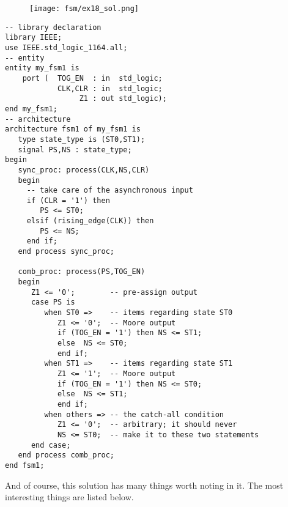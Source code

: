 \begin{figure}[!h]
    \centering
	\texttt{[image: fsm/ex18\_sol.png]}
\end{figure}

\noindent
\begin{minipage}{0.99\linewidth}
\begin{lstlisting}[label=exe_18_code, caption=Solution to Example~18.]
-- library declaration
library IEEE;
use IEEE.std_logic_1164.all;
-- entity
entity my_fsm1 is
    port (  TOG_EN  : in  std_logic;
            CLK,CLR : in  std_logic;
                 Z1 : out std_logic);
end my_fsm1;
-- architecture
architecture fsm1 of my_fsm1 is
   type state_type is (ST0,ST1);
   signal PS,NS : state_type;
begin
   sync_proc: process(CLK,NS,CLR)
   begin
     -- take care of the asynchronous input
     if (CLR = '1') then
        PS <= ST0;
     elsif (rising_edge(CLK)) then
        PS <= NS;
     end if;
   end process sync_proc;

   comb_proc: process(PS,TOG_EN)
   begin
      Z1 <= '0';        -- pre-assign output
      case PS is
         when ST0 =>    -- items regarding state ST0
            Z1 <= '0';  -- Moore output
            if (TOG_EN = '1') then NS <= ST1;
            else  NS <= ST0;
            end if;
         when ST1 =>    -- items regarding state ST1
            Z1 <= '1';  -- Moore output
            if (TOG_EN = '1') then NS <= ST0;
            else  NS <= ST1;
            end if;
         when others => -- the catch-all condition
            Z1 <= '0';  -- arbitrary; it should never
            NS <= ST0;  -- make it to these two statements
      end case;
   end process comb_proc;
end fsm1;
\end{lstlisting}
\end{minipage}

And of course, this solution has many things worth noting in it. The most interesting things are listed below.

